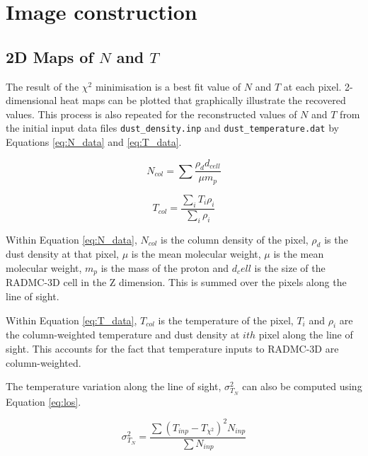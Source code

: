 \documentclass{report}
\begin{document}
\section{Image construction}

\subsection{2D Maps of $N$ and $T$}
The result of the $\chi^{2}$ minimisation is a best fit value of $N$ and $T$ at each pixel. 2-dimensional heat maps can be plotted that graphically illustrate the recovered values. This process is also repeated for the reconstructed values of $N$ and $T$ from the initial input data files \texttt{dust\_density.inp} and \texttt{dust\_temperature.dat} by Equations \ref{eq:N_data} and \ref{eq:T_data}.

\noindent\begin{minipage}{.5\linewidth}
\begin{equation}
  N_{col} = \sum{\frac{\rho_{d}d_{cell}}{\mu m_{p}}}
\end{equation} \label{eq:N_data}
\end{minipage}%
\begin{minipage}{.5\linewidth}
\begin{equation}
  T_{col} = \frac{\sum_{i} T_{i} \rho_{i}}{\sum_{i} \rho_{i}}
\end{equation} \label{eq:T_data}
\end{minipage}

Within Equation \ref{eq:N_data}, $N_{col}$ is the column density of the pixel, $\rho_{d}$ is the dust density at that pixel, $\mu$ is the mean molecular weight, $\mu$ is the mean molecular weight, $m_{p}$ is the mass of the proton and $d_cell$ is the size of the RADMC-3D cell in the Z dimension. This is summed over the pixels along the line of sight.

Within Equation \ref{eq:T_data}, $T_{col}$ is the temperature of the pixel, $T_{i}$ and $\rho_{i}$ are the column-weighted temperature and dust density at $ith$ pixel along the line of sight. This accounts for the fact that temperature inputs to RADMC-3D are column-weighted.

The temperature variation along the line of sight, $\sigma_{T_{N}}^{2}$ can also be computed using Equation \ref{eq:los}.

\begin{equation}
  \sigma_{T_{N}}^{2} = \frac{\sum{(T_{inp}-T_{\chi^{2}})^{2}}N_{inp}}{\sum{N_{inp}}}
\end{equation} \label{eq:los}
\end{document}
